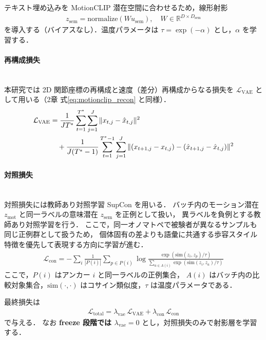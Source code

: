 テキスト埋め込みを MotionCLIP 潜在空間に合わせるため，線形射影
\begin{align}
  z_{\mathrm{sem}} = \mathrm{normalize}\left(W u_{\mathrm{sem}}\right),\quad W\in\mathbb{R}^{D\times D_{\mathrm{sem}}}
\end{align}
を導入する（バイアスなし）．温度パラメータは $\tau = \exp(-\alpha)$ とし，$\alpha$ を学習する．

\paragraph{再構成損失}\quad\\

本研究では 2D 関節座標の再構成と速度（差分）再構成からなる損失を
$\mathcal{L}_{\mathrm{VAE}}$ として用いる（2章 式\ref{eq:motionclip_recon} と同様）．
\begin{align}
  \mathcal{L}_{\mathrm{VAE}}
   & = \frac{1}{JT^\ast}\sum_{t=1}^{T^\ast}\sum_{j=1}^{J}\|x_{t,j} - \hat{x}_{t,j}\|^2 \notag \\
   & \quad + \frac{1}{J(T^\ast-1)}\sum_{t=1}^{T^\ast-1}\sum_{j=1}^{J}
  \|(x_{t+1,j}-x_{t,j})-(\hat{x}_{t+1,j}-\hat{x}_{t,j})\|^2
  \label{eq:proposed_vae_2d}
\end{align}

\paragraph{対照損失}\quad\\

対照損失には教師あり対照学習 SupCon \cite{supcon} を用いる．
バッチ内のモーション潜在 $z_{\mathrm{mot}}$ と同一ラベルの意味潜在 $z_{\mathrm{sem}}$ を正例として扱い，
異ラベルを負例とする教師あり対照学習を行う．
ここで，同一オノマトペで被験者が異なるサンプルも同じ正例群として扱うため，
個体固有の差よりも語彙に共通する歩容スタイル特徴を優先して表現する方向に学習が進む．
\begin{align}
  \mathcal{L}_{\mathrm{con}}
  =
  -\sum_i \frac{1}{|P(i)|}
  \sum_{p\in P(i)}
  \log
  \frac{\exp\!\left(\mathrm{sim}(z_i,z_p)/\tau\right)}
       {\sum_{a\in A(i)} \exp\!\left(\mathrm{sim}(z_i,z_a)/\tau\right)}
\end{align}
ここで，$P(i)$ はアンカー $i$ と同一ラベルの正例集合，
$A(i)$ はバッチ内の比較対象集合，$\mathrm{sim}(\cdot,\cdot)$ はコサイン類似度，$\tau$ は温度パラメータである．

最終損失は
\begin{align}
  \mathcal{L}_{\mathrm{total}}
  = \lambda_{\mathrm{vae}}\,\mathcal{L}_{\mathrm{VAE}} + \lambda_{\mathrm{con}}\,\mathcal{L}_{\mathrm{con}}
\end{align}
で与える．
なお \textbf{freeze 段階では $\lambda_{\mathrm{vae}}=0$} とし，対照損失のみで射影層を学習する．

